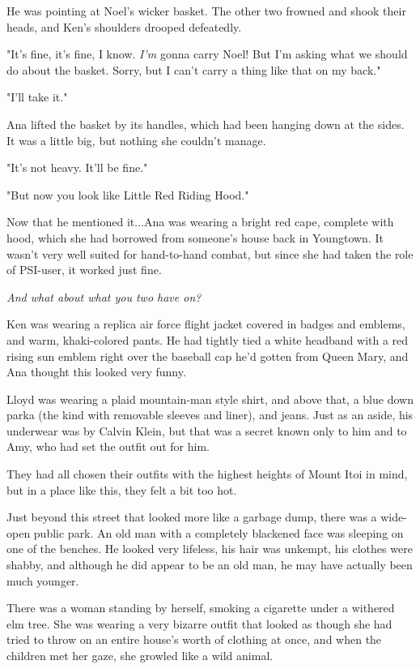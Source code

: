 \documentclass[
]{article}
\begin{document}
He was pointing at Noel's wicker basket. The other two frowned and shook
their heads, and Ken's shoulders drooped defeatedly.

"It's fine, it's fine, I know. \emph{I'm} gonna carry Noel! But I'm
asking what we should do about the basket. Sorry, but I can't carry a
thing like that on my back."

"I'll take it."

Ana lifted the basket by its handles, which had been hanging down at the
sides. It was a little big, but nothing she couldn't manage.

"It's not heavy. It'll be fine."

"But now you look like Little Red Riding Hood."

Now that he mentioned it...Ana was wearing a bright red cape, complete
with hood, which she had borrowed from someone's house back in
Youngtown. It wasn't very well suited for hand-to-hand combat, but since
she had taken the role of PSI-user, it worked just fine.

\emph{And what about what you two have on?}

Ken was wearing a replica air force flight jacket covered in badges and
emblems, and warm, khaki-colored pants. He had tightly tied a white
headband with a red rising sun emblem right over the baseball cap he'd
gotten from Queen Mary, and Ana thought this looked very funny.

Lloyd was wearing a plaid mountain-man style shirt, and above that, a
blue down parka (the kind with removable sleeves and liner), and jeans.
Just as an aside, his underwear was by Calvin Klein, but that was a
secret known only to him and to Amy, who had set the outfit out for him.

They had all chosen their outfits with the highest heights of Mount Itoi
in mind, but in a place like this, they felt a bit too hot.

Just beyond this street that looked more like a garbage dump, there was
a wide-open public park. An old man with a completely blackened face was
sleeping on one of the benches. He looked very lifeless, his hair was
unkempt, his clothes were shabby, and although he did appear to be an
old man, he may have actually been much younger.

There was a woman standing by herself, smoking a cigarette under a
withered elm tree. She was wearing a very bizarre outfit that looked as
though she had tried to throw on an entire house's worth of clothing at
once, and when the children met her gaze, she growled like a wild
animal.
\end{document}
